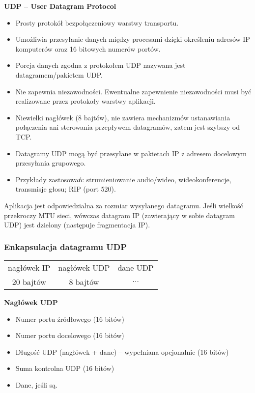 \documentclass[../main.tex]{subfiles}
\begin{document}
    \textbf{UDP – User Datagram Protocol}
    \begin{itemize}
        \item Prosty protokół bezpołączeniowy warstwy transportu.
        \item Umożliwia przesyłanie danych między procesami dzięki określeniu adresów IP komputerów oraz 16 bitowych numerów portów.
        \item Porcja danych zgodna z protokołem UDP nazywana jest datagramem/pakietem UDP.
        \item Nie zapewnia niezawodności. Ewentualne zapewnienie niezawodności musi być realizowane przez protokoły warstwy aplikacji.
        \item Niewielki nagłówek (8 bajtów), nie zawiera mechanizmów ustanawiania połączenia ani sterowania przepływem datagramów, zatem jest szybszy od TCP.
        \item Datagramy UDP mogą być przesyłane w pakietach IP z adresem docelowym przesyłania grupowego.
        \item Przykłady zastosowań: strumieniowanie audio/wideo, wideokonferencje, transmisje głosu; RIP (port 520).
    \end{itemize}

    Aplikacja jest odpowiedzialna za rozmiar wysyłanego datagramu. Jeśli wielkość przekroczy
    MTU sieci, wówczas datagram IP (zawierający w sobie datagram UDP) jest dzielony
    (następuje fragmentacja IP).


    \subsubsection{Enkapsulacja datagramu UDP}

    \begin{tabular}{|c|c|c|}
        \hline
        nagłówek IP & nagłówek UDP & dane UDP\\
        20 bajtów & 8 bajtów & $\dots$\\
        \hline
    \end{tabular}

    \textbf{Nagłówek UDP}
    \begin{itemize}
        \item Numer portu źródłowego (16 bitów)
        \item Numer portu docelowego (16 bitów)
        \item Długość UDP (nagłówek + dane) – wypełniana opcjonalnie (16 bitów)
        \item Suma kontrolna UDP (16 bitów)
        \item Dane, jeśli są.
    \end{itemize}
\end{document}
